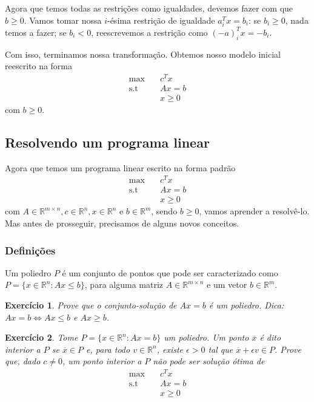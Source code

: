 \documentclass[]{article}
\newtheorem{exercicio}{Exercício}
\numberwithin{equation}{section}
\begin{document}
Agora que temos todas as restrições como igualdades, devemos fazer com que $b \geq 0$.
Vamos tomar nossa $i$-ésima restrição de igualdade $a_i^Tx = b_i$: se $b_i \geq 0$, nada temos a
fazer; se $b_i < 0$, reescrevemos a restrição como $(-a)_i^Tx = -b_i$.

Com isso, terminamos nossa transformação. Obtemos nosso modelo inicial reescrito na forma
\begin{align}
\max        &\quad  c^Tx \\
\text{s.t}  &\quad  Ax = b \\
            &\quad  x \geq 0
\end{align}
com $b \geq 0$.

\subsection{Resolvendo um programa linear}

Agora que temos um programa linear escrito na forma padrão
\begin{align}
\max        &\quad  c^Tx \\
\text{s.t}  &\quad  Ax = b \\
            &\quad  x \geq 0
\end{align}
com $A \in \mathbb{R}^{m \times n}, c \in \mathbb{R}^n, x \in \mathbb{R}^n$ e $b \in \mathbb{R}^m$,
sendo $b \geq 0$, vamos aprender a resolvê-lo.
Mas antes de prosseguir, precisamos de alguns novos conceitos.

\subsubsection{Definições}

Um poliedro $P$ é um conjunto de pontos que pode ser caracterizado como
$P = \{x \in \mathbb{R}^n : Ax \leq b\}$, para alguma matriz $A \in \mathbb{R}^{m \times n}$ e um
vetor $b \in \mathbb{R}^m$.

\begin{exercicio}
  Prove que o conjunto-solução de $Ax = b$ é um poliedro.
  Dica: $Ax = b \iff Ax \leq b$ e $Ax \geq b$.
\end{exercicio}

\begin{exercicio}
  Tome $P = \{x \in \mathbb{R}^n : Ax = b\}$ um poliedro.
  Um ponto $\overline{x}$ é dito interior a $P$ se $\overline{x} \in P$ e, para todo
  $v \in \mathbb{R}^n$, existe $\epsilon > 0$ tal que $\overline{x} + \epsilon v \in P$.
  Prove que, dado $c \neq 0$, um ponto interior a $P$ não pode ser solução ótima de
  \begin{align}
  \max        &\quad  c^Tx \\
  \text{s.t}  &\quad  Ax = b \\
              &\quad  x \geq 0
  \end{align}
\end{exercicio}
\end{document}
